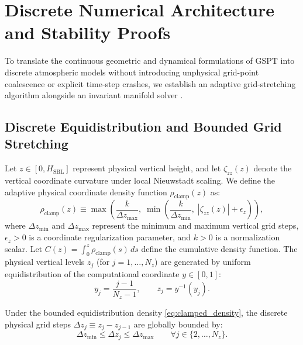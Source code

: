 \section{Discrete Numerical Architecture and Stability Proofs}
\label{sec:discrete_proofs}

To translate the continuous geometric and dynamical formulations of GSPT into discrete atmospheric models without introducing unphysical grid-point coalescence or explicit time-step crashes, we establish an adaptive grid-stretching algorithm alongside an invariant manifold solver \cite{nieuwstadt1984}.

\subsection{Discrete Equidistribution and Bounded Grid Stretching}

Let $z \in [0, H_{\text{SBL}}]$ represent physical vertical height, and let $\zeta_{zz}(z)$ denote the vertical coordinate curvature under local Nieuwstadt scaling. We define the adaptive physical coordinate density function $\rho_{\text{clamp}}(z)$ as:
\begin{equation}
    \rho_{\text{clamp}}(z) \equiv \max\left( \frac{k}{\Delta z_{\text{max}}}, \; \min\left( \frac{k}{\Delta z_{\text{min}}}, \; \left| \zeta_{zz}(z) \right| + \epsilon_z \right) \right), \label{eq:clamped_density}
\end{equation}
where $\Delta z_{\text{min}}$ and $\Delta z_{\text{max}}$ represent the minimum and maximum vertical grid steps, $\epsilon_z > 0$ is a coordinate regularization parameter, and $k > 0$ is a normalization scalar. Let $C(z) = \int_0^z \rho_{\text{clamp}}(s) \, ds$ define the cumulative density function. The physical vertical levels $z_j$ (for $j = 1, \dots, N_z$) are generated by uniform equidistribution of the computational coordinate $y \in [0, 1]$:
\begin{equation}
    y_j = \frac{j - 1}{N_z - 1}, \qquad z_j = y^{-1}(y_j). \label{eq:node_mapping}
\end{equation}

\begin{theorem}
\label{thm:grid_bounds}
Under the bounded equidistribution density \eqref{eq:clamped_density}, the discrete physical grid steps $\Delta z_j \equiv z_j - z_{j-1}$ are globally bounded by:
\begin{equation}
    \Delta z_{\text{min}} \le \Delta z_j \le \Delta z_{\text{max}} \qquad \forall j \in \{2, \dots, N_z\}. \label{eq:discrete_bounds_theorem}
\end{equation}
\end{theorem}

